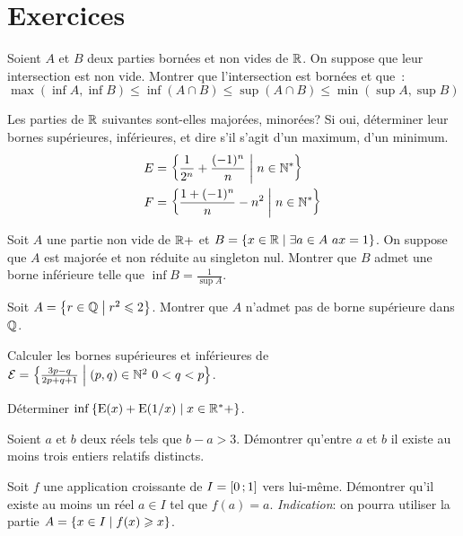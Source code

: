 \section{Exercices}
\begin{exercice}
    Soient \(A\) et \(B\) deux parties bornées et non vides de \(\mathbb{R}\). On suppose que leur intersection est non vide. Montrer que l'intersection est bornées et que~:
    \[ \max(\inf A, \inf B) \leqslant \inf(A \cap B) \leqslant \sup(A \cap B) \leqslant \min(\sup A, \sup B)\]
\end{exercice}
\begin{exercice}
    Les parties de \(\mathbb{R}\) suivantes sont-elles majorées, minorées? Si oui, déterminer leur bornes supérieures, inférieures, et dire s'il s'agit d'un maximum, d'un minimum.
    \begin{align*}
        E &= \left\{\frac{1}{2^n}+\frac{(-1)^n}{n}\mathrel{}\middle|\mathrel{}n \in \mathbb{N}^*\right\} \\
        F &= \left\{\frac{1+(-1)^n}{n}-n^2\mathrel{}\middle|\mathrel{}n \in \mathbb{N}^*\right\}
    \end{align*}
\end{exercice}
\begin{exercice}
    Soit \(A\) une partie non vide de \(\mathbb{R}+\) et \(B = \enstq{x \in \R}{\exists a \in A \ ax=1}\). On suppose que \(A\) est majorée et non réduite au singleton nul. Montrer que \(B\) admet une borne inférieure telle que \(\inf B = \frac{1}{\sup A}\).
\end{exercice}
\begin{exercice}
    Soit \(A = \left\{r \in \mathbb{Q}\mathrel{}\middle|\mathrel{}r^2 \leqslant 2\right\}\). Montrer que \(A\) n'admet pas de borne supérieure dans \(\mathbb{Q}\).
\end{exercice}
\begin{exercice}
    Calculer les bornes supérieures et inférieures de \(\mathcal{E} = \left\{\frac{3p-q}{2p+q+1}\mathrel{}\middle|\mathrel{}(p,q) \in \mathbb{N}^2 \ 0 <q<p\right\}\).
\end{exercice}
\begin{exercice}
    Déterminer \(\inf \left\{\operatorname{E}(x) + \operatorname{E}(1/x)\mathrel{}\middle|\mathrel{}x \in \mathbb{R}^*+\right\}\).
\end{exercice}
\begin{exercice}
    Soient \(a\) et \(b\) deux réels tels que \(b-a>3\). Démontrer qu'entre \(a\) et \(b\) il existe au moins trois entiers relatifs distincts.
\end{exercice}
\begin{exercice}
    Soit \(f\) une application croissante de \(I = \left[ 0 \, ;  1 \right]\) vers lui-même. Démontrer qu'il existe au moins un réel \(a \in I\) tel que \(f(a)=a\).
    \emph{Indication}: on pourra utiliser la partie \(A = \left\{x \in I\mathrel{}\middle|\mathrel{}f(x) \geqslant x\right\}\).
\end{exercice}

